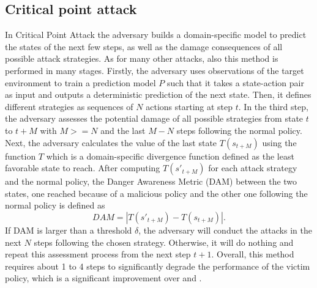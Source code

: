 \subsection{Critical point attack}
In Critical Point Attack \cite{sun2020stealthy} the adversary builds a domain-specific model to predict the states of the next few steps, as well as the damage consequences of all possible attack strategies. As for many other attacks, also this method is performed in many stages. Firstly, the adversary uses observations of the target environment to train a prediction model \(P\) such that it takes a state-action pair as input and outputs a deterministic prediction of the next state. Then, it defines different strategies as sequences of \(N\) actions starting at step \(t\). In the third step, the adversary assesses the potential damage of all possible strategies from state \(t\) to \(t+M\) with \(M>=N\) and the last \(M-N\) steps following the normal policy. Next, the adversary calculates the value of the last state \(T(s_{t+M})\) using the function \(T\) which is a domain-specific divergence function defined as the least favorable state to reach. After computing \(T(s'_{t+M})\) for each attack strategy and the normal policy, the Danger Awareness Metric (DAM) between the two states, one reached because of a malicious policy and the other one following the normal policy is defined as
\begin{equation}
DAM=|T(s'_{t+M})-T(s_{t+M})|.
\end{equation}
If DAM is larger than a threshold \(\delta\), the adversary will conduct the attacks in the next \(N\) steps following the chosen strategy. Otherwise, it will do nothing and repeat this assessment process from the next step \(t + 1\). Overall, this method requires about 1 to 4 steps to significantly degrade the performance of the victim policy, which is a significant improvement over \cite{s2017adversarial} and \cite{lin2017tactics}.

